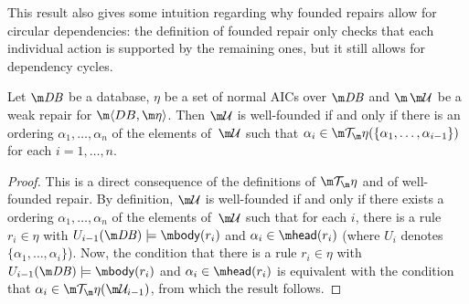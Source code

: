 This result also gives some intuition regarding why founded repairs allow for circular dependencies: the definition of founded repair only checks that each individual action is supported by the remaining ones, but it still allows for dependency cycles.

\begin{proposition}
  \label{prop:wf}
  Let $\db$ be a database, $\eta$ be a set of normal AICs over $\db$ and $\spaceUU$ be a weak repair for $\fulldb$.
  Then $\UU$ is well-founded if and only if there is an ordering $\alpha_1,\ldots,\alpha_n$ of the elements of\, $\UU$ such that $\alpha_i\in\Op(\{\alpha_1,\ldots,\alpha_{i-1}\})$ for each $i=1,\ldots,n$.
\end{proposition}
\begin{proof}
This is a direct consequence of the definitions of $\Op$ and of well-founded repair. 
By definition, $\UU$ is well-founded if and only if there exists a ordering  $\alpha_1,\ldots,\alpha_n$ of the elements of\, $\UU$ such that for each $i$, there is a rule $r_i\in\eta$ with $U_{i-1}(\db)\models\body(r_i)$ and $\alpha_i\in\head(r_i)$ (where $U_i$ denotes $\{\alpha_1,\ldots,\alpha_i\}$).
Now, the condition that there is a rule $r_i\in\eta$ with $U_{i-1}(\db)\models\body(r_i)$ and $\alpha_i\in\head(r_i)$ is equivalent with the condition that $\alpha_i\in \Op(\UU_{i-1})$, from which the result follows. 
\end{proof}


